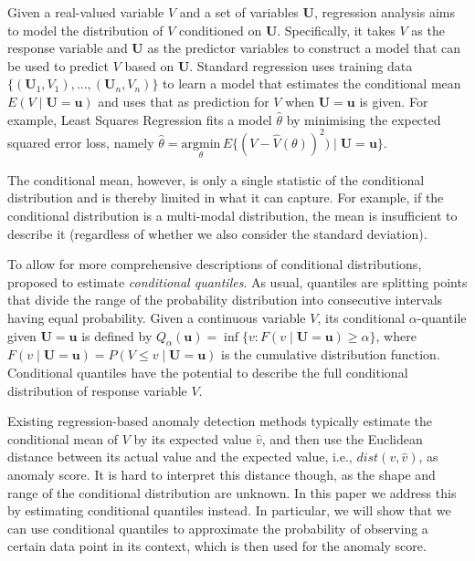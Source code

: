 \documentclass[pdflatex,sn-basic]{sn-jnl}%
\theoremstyle{thmstyleone}%
\theoremstyle{thmstyletwo}%
\theoremstyle{thmstylethree}%
\begin{document}
Given a real-valued variable $V$ and a set of variables $\mathbf{U}$, regression analysis aims to model the distribution of $V$ conditioned on $\mathbf{U}$. Specifically, it takes $V$ as the response variable and $\mathbf{U}$ as the predictor variables to construct a model that can be used to predict $V$ based on $\mathbf{U}$. 
Standard regression uses training data $\{(\mathbf{U}_{1},V_{1}),...,(\mathbf{U}_{n},V_{n})\}$ to learn a model that estimates the conditional mean $E(V \mid \mathbf{U}=\mathbf{u})$ and uses that as prediction for $V$ when $\mathbf{U}=\mathbf{u}$ is given. For example, Least Squares Regression fits a model $\hat{\theta}$ by minimising the expected squared error loss, namely $\hat{\theta} =  \underset{\theta}{\mathrm{argmin}}\, E\{(V-\hat{V}(\theta))^{2})\mid \mathbf{U}=\mathbf{u}\}$. 

The conditional mean, however, is only a single statistic of the conditional distribution and is thereby limited in what it can capture. For example, if the conditional distribution is a multi-modal distribution, the mean is insufficient to describe it (regardless of whether we also consider the standard deviation). 

To allow for more comprehensive descriptions of conditional distributions, \cite{koenker2001quantile} proposed to estimate \emph{conditional quantiles}. As usual, quantiles are splitting points that divide the range of the probability distribution into consecutive intervals having equal probability. Given a continuous variable $V$, its conditional $\alpha$-quantile given $\mathbf{U}=\mathbf{u}$ is defined by $Q_{\alpha}(\mathbf{u}) = \inf \{v: F(v \mid \mathbf{U}=\mathbf{u}) \geq \alpha\}$, where $F(v \mid \mathbf{U}=\mathbf{u}) = P(V \leq v \mid \mathbf{U}=\mathbf{u})$ is the cumulative distribution function. Conditional quantiles have the potential to describe the full conditional distribution of response variable $V$.

Existing regression-based anomaly detection methods typically estimate the conditional mean of $V$ by its expected value  $\hat{v}$, and then use the Euclidean distance between its actual value and the expected value, i.e., $dist(v,\hat{v})$, as anomaly score. It is hard to interpret this distance though, as the shape and range of the conditional distribution are unknown. In this paper we address this by estimating conditional quantiles instead. In particular, we will show that we can use conditional quantiles to approximate the probability of observing a certain data point in its context, which is then used for the anomaly score. 
\end{document}
